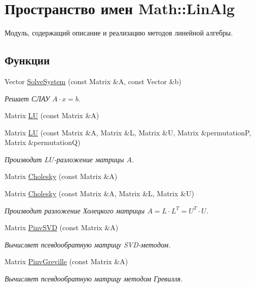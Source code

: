 \hypertarget{namespace_math_1_1_lin_alg}{}\section{Пространство имен Math\+:\+:Lin\+Alg}
\label{namespace_math_1_1_lin_alg}


Модуль, содержащий описание и реализацию методов линейной алгебры.  


\subsection*{Функции}
\begin{DoxyCompactItemize}
\item 
Vector \hyperlink{namespace_math_1_1_lin_alg_ab6e559246eac7fcd1bb0ef18fc4657ee}{Solve\+System} (const Matrix \&A, const Vector \&b)
\begin{DoxyCompactList}\small\item\em Решает СЛАУ $ A \cdot x = b$. \end{DoxyCompactList}\item 
Matrix \hyperlink{namespace_math_1_1_lin_alg_ad6053d7dea0e4d128cdcff0d8423708a}{LU} (const Matrix \&A)
\item 
Matrix \hyperlink{namespace_math_1_1_lin_alg_ad84a3dd8b243ffbc96f777aebafcbd8f}{LU} (const Matrix \&A, Matrix \&L, Matrix \&U, Matrix \&permutationP, Matrix \&permutationQ)
\begin{DoxyCompactList}\small\item\em Производит $LU$-\/разложение матрицы $A$. \end{DoxyCompactList}\item 
Matrix \hyperlink{namespace_math_1_1_lin_alg_a63d9cc41c4735dc5cefd2ec8880f432c}{Cholesky} (const Matrix \&A)
\item 
Matrix \hyperlink{namespace_math_1_1_lin_alg_a980590dcd2dcd5557b299e7b5dfc1946}{Cholesky} (const Matrix \&A, Matrix \&L, Matrix \&U)
\begin{DoxyCompactList}\small\item\em Производит разложение Холецкого матрицы $A = L \cdot L^{T} = U^{T} \cdot U$. \end{DoxyCompactList}\item 
Matrix \hyperlink{namespace_math_1_1_lin_alg_adaef1c5da9ab98ab6e106086383e3ed6}{Pinv\+S\+VD} (const Matrix \&A)
\begin{DoxyCompactList}\small\item\em Вычисляет псевдообратную матрицу S\+V\+D-\/методом. \end{DoxyCompactList}\item 
Matrix \hyperlink{namespace_math_1_1_lin_alg_a03abc1453c96f7898d89262f5278aefc}{Pinv\+Greville} (const Matrix \&A)
\begin{DoxyCompactList}\small\item\em Вычисляет псевдообратную матрицу методом Гревилля. \end{DoxyCompactList}\end{DoxyCompactItemize}


